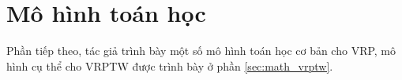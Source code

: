\section{Mô hình toán học}
\label{sec:math}

Phần tiếp theo, tác giả trình bày một số mô hình toán học cơ bản cho VRP, mô hình cụ thể cho VRPTW được trình bày ở phần \ref{sec:math_vrptw}. 


